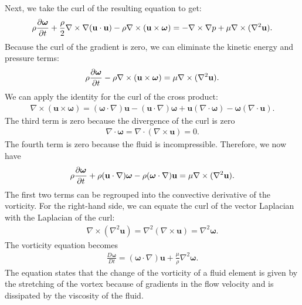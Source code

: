 Next, we take the curl of the resulting equation to get:
\begin{align}
  \rho \frac{ \partial {\mathbf{\boldsymbol\omega}} }{ \partial {t} } + \frac{\rho}{2} \nabla \times \nabla ( \mathbf{u} \cdot \mathbf{u} ) - \rho \nabla \times ( \mathbf{u} \times \boldsymbol\omega ) =  -\nabla \times \nabla p + \mu \nabla \times ( \nabla^2 \mathbf{u} ).
\end{align}
Because the curl of the gradient is zero, we can eliminate the kinetic energy and pressure terms:
\begin{align}
  \rho \frac{ \partial {\mathbf{\boldsymbol\omega}} }{ \partial {t} } - \rho \nabla \times ( \mathbf{u} \times \boldsymbol\omega )  =  \mu \nabla \times ( \nabla^2 \mathbf{u} ).
\end{align}
We can apply the identity for the curl of the cross product:
\begin{align}
  \nabla \times ( \mathbf{u} \times \boldsymbol\omega ) = 
  ( \boldsymbol\omega \cdot \nabla ) \mathbf{u} - ( \mathbf{u} \cdot \nabla ) \boldsymbol\omega + \mathbf{u} ( \nabla \cdot \boldsymbol\omega ) - \boldsymbol\omega ( \nabla \cdot \mathbf{u} ) .
\end{align}
The third term is zero because the divergence of the curl is zero
\begin{align}
   \nabla \cdot \boldsymbol\omega =  \nabla \cdot ( \nabla \times \mathbf{u} ) = 0.
\end{align}
The fourth term is zero because the fluid is incompressible. Therefore, we now have
\begin{align}
  \rho \frac{ \partial {\mathbf{\boldsymbol\omega}} }{ \partial {t} } + \rho ( \mathbf{u} \cdot \nabla ) \boldsymbol\omega - \rho ( \boldsymbol\omega \cdot \nabla ) \mathbf{u}  =  \mu \nabla \times ( \nabla^2 \mathbf{u} ).
\end{align}
The first two terms can be regrouped into the convective derivative of the vorticity. For the right-hand side, we can equate the curl of the vector Laplacian with the Laplacian of the curl:
\begin{align}
  \nabla \times ( \nabla^2 \mathbf{u} ) = \nabla^2 ( \nabla \times \mathbf{u} ) = \nabla^2 \boldsymbol\omega .
\end{align}
The vorticity equation becomes
\begin{align}
  \frac{D \boldsymbol\omega }{ Dt } = ( \boldsymbol\omega \cdot \nabla ) \mathbf{u} + \frac{\mu}{\rho} \nabla^2 \boldsymbol\omega .
\end{align}
The equation states that the change of the vorticity of a fluid element is given by the stretching of the vortex because of gradients in the flow velocity and is dissipated by the viscosity of the fluid.


